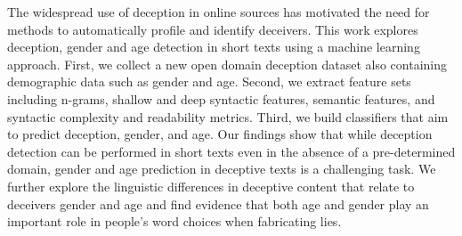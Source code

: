 The widespread use of deception in online sources has motivated the need for methods to automatically profile and identify deceivers. This work explores deception, gender and age detection in short texts using a machine learning approach. First, we collect a new open domain deception dataset also containing demographic data such as gender and age. Second, we extract feature sets including n-grams, shallow and deep syntactic features, semantic features, and syntactic complexity and readability metrics. Third, we build classifiers that aim to predict deception, gender, and age. Our findings show that while deception detection can be performed in short texts even in the absence of a pre-determined domain, gender and age prediction in deceptive texts is a challenging task. We further explore the linguistic differences in deceptive content that relate to deceivers gender and age and find evidence that both age and gender play an important role in people's word choices when fabricating lies.
